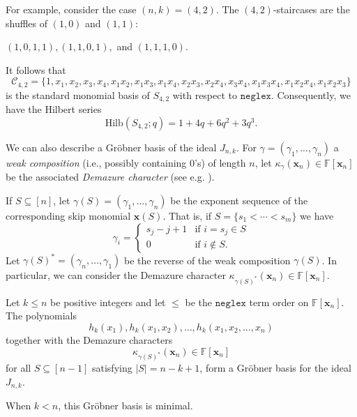 \documentclass[ALCO,ThmDefs,published]{cedram}
\newcommand{\xx}{{\mathbf {x}}}
\newcommand{\FF}{{\mathbb{F}}}
\theoremstyle{plain}
\newcommand{\Hilb}{{\mathrm {Hilb}}}
\newcommand{\neglex}{{\mathtt {neglex}}}
\newcommand{\FF}{{\mathbb{F}}}
\newcommand{\CCC}{{\mathcal{C}}}
\newcommand{\xx}{{\mathbf {x}}}
\begin{document}
For example, consider the case $(n,k) = (4,2)$.  The $(4,2)$-staircases are the shuffles of $(1,0)$ and $(1,1)$:
\begin{center}
$(1,0,1,1), (1,1,0,1),$ and $(1,1,1,0)$.
\end{center}
It follows that 
\begin{equation*}
\CCC_{4,2} = \{1, x_1, x_2, x_3, x_4, x_1 x_2, x_1 x_3, x_1 x_4, x_2 x_3, x_2 x_4, x_3 x_4, x_1 x_3 x_4, 
x_1 x_2 x_4, x_1 x_2 x_3 \}
\end{equation*}
is the standard monomial basis of $S_{4,2}$ with respect to $\neglex$.  Consequently, we have the Hilbert series
\begin{equation*}
\Hilb(S_{4,2};q) = 1 + 4q + 6q^2 + 3q^3.
\end{equation*}

We can also describe a Gr\"obner basis of the ideal $J_{n,k}$.
For $\gamma = (\gamma_1, \dots, \gamma_n)$  a \emph{weak composition} (i.e., possibly containing $0$'s)
of length $n$, let $\kappa_{\gamma}(\xx_n) \in \FF[\xx_n]$ be the associated \emph{Demazure character}
(see e.g. \cite[Sec. 2.4]{HRS}).  

If $S \subseteq [n]$, let $\gamma(S) = (\gamma_1, \dots, \gamma_n)$ be the exponent sequence of the corresponding
skip monomial $\xx(S)$.  That is, if $S = \{s_1 < \cdots < s_m\}$ we have
\begin{equation}
\gamma_i = \begin{cases}
s_j - j + 1 & \text{if $i = s_j \in S$} \\
0 & \text{if $i \notin S$}.
\end{cases}
\end{equation}
Let $\gamma(S)^* = (\gamma_n, \dots, \gamma_1)$ be the reverse of the weak composition $\gamma(S)$.
In particular, we can consider the Demazure character $\kappa_{\gamma(S)^*}(\xx_n) \in \FF[\xx_n]$.

\begin{theorem}
\label{groebner-basis}
Let $k \leq n$ be positive integers and
let $\leq$ be the $\neglex$ term order on $\FF[\xx_n]$. The polynomials
\begin{equation*}
h_k(x_1), h_k(x_1, x_2), \dots, h_k(x_1, x_2, \dots, x_n)
\end{equation*}
together with the Demazure characters
\begin{equation*}
\kappa_{\gamma(S)^*}(\xx_n) \in \FF[\xx_n]
\end{equation*}
for all $S \subseteq [n-1]$ satisfying $|S| = n-k+1$, form a Gr\"obner basis for the ideal $J_{n,k}$.

When $k < n$, this Gr\"obner basis is minimal.
\end{theorem}
\end{document}
